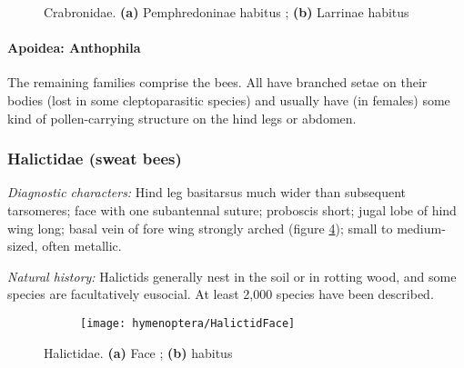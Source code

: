 \begin{figure}[ht!]
    \centering
    \begin{subfigure}[ht!]{0.44\textwidth}
        \caption{}
        \label{fig:crabronid1}
    \end{subfigure}
    \qquad
    \begin{subfigure}[ht!]{0.38\textwidth}
        \caption{}
        \label{fig:crabronid2}
    \end{subfigure}
    \caption{Crabronidae. \textbf{(a)} Pemphredoninae habitus \citep[][Fig. 99]{goulet1993hymenoptera}; \textbf{(b)} Larrinae habitus \citep[][Fig. 102]{goulet1993hymenoptera}}\label{fig:crabronids}
\end{figure}
\FloatBarrier

\paragraph*{Apoidea: Anthophila} The remaining families comprise the bees. All have branched setae on their bodies (lost in some cleptoparasitic species) and usually have (in females) some kind of pollen-carrying structure on the hind legs or abdomen.\vspace{3mm}

\subsubsection{Halictidae (sweat bees)}
\noindent{}\textit{Diagnostic characters:} Hind leg basitarsus much wider than subsequent tarsomeres; face with one subantennal suture; proboscis short; jugal lobe of hind wing long; basal vein of fore wing strongly arched (figure \ref{fig:halict1}); small to medium-sized, often metallic.\vspace{3mm}

\noindent{}\textit{Natural history:} Halictids generally nest in the soil or in rotting wood, and some species are facultatively eusocial. At least 2,000 species have been described.

\begin{figure}[ht!]
    \centering
    \begin{subfigure}[ht!]{0.26\textwidth}
        \texttt{[image: hymenoptera/HalictidFace]}
        \caption{}
        \label{fig:halict1}
    \end{subfigure}
    \qquad
    \begin{subfigure}[ht!]{0.4\textwidth}
        \caption{}
        \label{fig:halict2}
    \end{subfigure}
    \caption{Halictidae. \textbf{(a)} Face \citep[][pg. 315]{goulet1993hymenoptera}; \textbf{(b)} habitus \citep[][Fig. 118]{goulet1993hymenoptera}}\label{fig:halictidae}
\end{figure}

